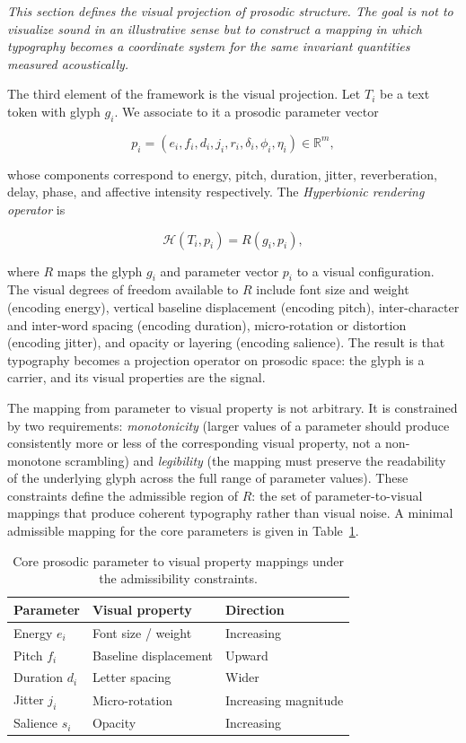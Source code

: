 \documentclass[12pt, a4paper]{article}
\begin{document}
\noindent\textit{This section defines the visual projection of prosodic structure. The goal is not to visualize sound in an illustrative sense but to construct a mapping in which typography becomes a coordinate system for the same invariant quantities measured acoustically.}


The third element of the framework is the visual projection. Let $T_i$ be a text token with glyph $g_i$. We associate to it a prosodic parameter vector

\begin{equation}
p_i = (e_i, f_i, d_i, j_i, r_i, \delta_i, \phi_i, \eta_i) \in \mathbb{R}^m,
\label{eq:pi}
\end{equation}

whose components correspond to energy, pitch, duration, jitter, reverberation, delay, phase, and affective intensity respectively. The \emph{Hyperbionic rendering operator} is

\begin{equation}
\mathcal{H}(T_i, p_i) = R(g_i, p_i),
\label{eq:H}
\end{equation}

where $R$ maps the glyph $g_i$ and parameter vector $p_i$ to a visual configuration. The visual degrees of freedom available to $R$ include font size and weight (encoding energy), vertical baseline displacement (encoding pitch), inter-character and inter-word spacing (encoding duration), micro-rotation or distortion (encoding jitter), and opacity or layering (encoding salience). The result is that typography becomes a projection operator on prosodic space: the glyph is a carrier, and its visual properties are the signal.

The mapping from parameter to visual property is not arbitrary. It is constrained by two requirements: \emph{monotonicity} (larger values of a parameter should produce consistently more or less of the corresponding visual property, not a non-monotone scrambling) and \emph{legibility} (the mapping must preserve the readability of the underlying glyph across the full range of parameter values). These constraints define the admissible region of $R$: the set of parameter-to-visual mappings that produce coherent typography rather than visual noise. A minimal admissible mapping for the core parameters is given in Table~\ref{tab:mapping}.

\begin{table}[h]
\centering
\begin{tabular}{lll}
\hline
\textbf{Parameter} & \textbf{Visual property} & \textbf{Direction} \\
\hline
Energy $e_i$ & Font size / weight & Increasing \\
Pitch $f_i$ & Baseline displacement & Upward \\
Duration $d_i$ & Letter spacing & Wider \\
Jitter $j_i$ & Micro-rotation & Increasing magnitude \\
Salience $s_i$ & Opacity & Increasing \\
\hline
\end{tabular}
\caption{Core prosodic parameter to visual property mappings under the admissibility constraints.}
\label{tab:mapping}
\end{table}
\end{document}
